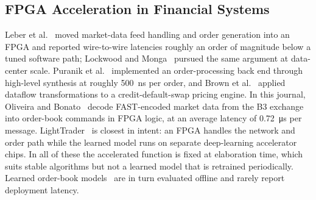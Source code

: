 \documentclass[pdflatex,sn-mathphys-num,iicol]{sn-jnl}
\begin{document}
\subsection{FPGA Acceleration in Financial Systems}
Leber et al.~\cite{Leber2011} moved market-data feed handling and order
generation into an FPGA and reported wire-to-wire latencies roughly an order of
magnitude below a tuned software path; Lockwood and Monga~\cite{Lockwood2015}
pursued the same argument at data-center scale. Puranik et
al.~\cite{Puranik2023} implemented an order-processing back end through
high-level synthesis at roughly \SI{500}{\nano\second} per order, and Brown et
al.~\cite{Brown2021} applied dataflow transformations to a credit-default-swap
pricing engine. In this journal, Oliveira and Bonato~\cite{Oliveira2023} decode
FAST-encoded market data from the B3 exchange into order-book commands in FPGA
logic, at an average latency of \SI{0.72}{\micro\second} per message.
LightTrader~\cite{Yoo2023} is closest in intent: an FPGA
handles the network and order path while the learned model runs on separate
deep-learning accelerator chips. In all of these the accelerated function is
fixed at elaboration time, which suits stable algorithms but not a learned model
that is retrained periodically. Learned order-book models~\cite{Zhang2019,
Ntakaris2018} are in turn evaluated offline and rarely report deployment
latency.
\end{document}
